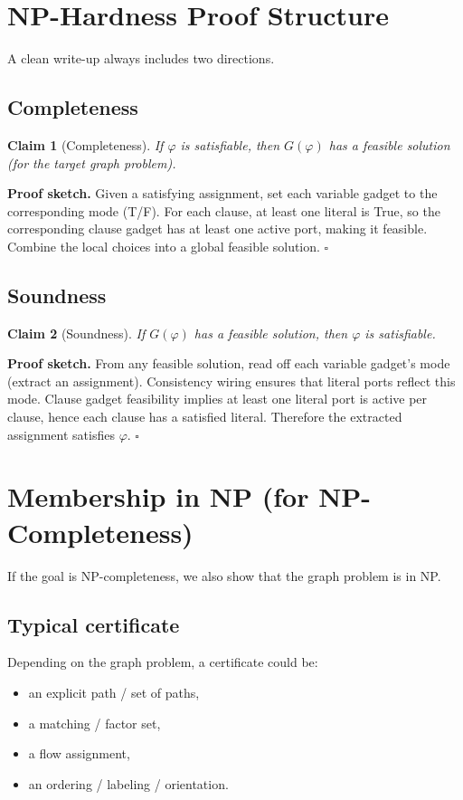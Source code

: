 \documentclass[11pt]{article}
\newtheorem{claim}{Claim}
\begin{document}
\section{NP-Hardness Proof Structure}
A clean write-up always includes two directions.

\subsection{Completeness}
\begin{claim}[Completeness]
If $\varphi$ is satisfiable, then $G(\varphi)$ has a feasible solution (for the target graph problem).
\end{claim}
\noindent \textbf{Proof sketch.}
Given a satisfying assignment, set each variable gadget to the corresponding mode (T/F). For each clause, at least one literal is True, so the corresponding clause gadget has at least one active port, making it feasible. Combine the local choices into a global feasible solution. \hfill $\square$

\subsection{Soundness}
\begin{claim}[Soundness]
If $G(\varphi)$ has a feasible solution, then $\varphi$ is satisfiable.
\end{claim}
\noindent \textbf{Proof sketch.}
From any feasible solution, read off each variable gadget's mode (extract an assignment). Consistency wiring ensures that literal ports reflect this mode. Clause gadget feasibility implies at least one literal port is active per clause, hence each clause has a satisfied literal. Therefore the extracted assignment satisfies $\varphi$. \hfill $\square$

\section{Membership in NP (for NP-Completeness)}
If the goal is NP-completeness, we also show that the graph problem is in NP.

\subsection*{Typical certificate}
Depending on the graph problem, a certificate could be:
\begin{itemize}[itemsep=2pt]
  \item an explicit path / set of paths,
  \item a matching / factor set,
  \item a flow assignment,
  \item an ordering / labeling / orientation.
\end{itemize}
\end{document}
